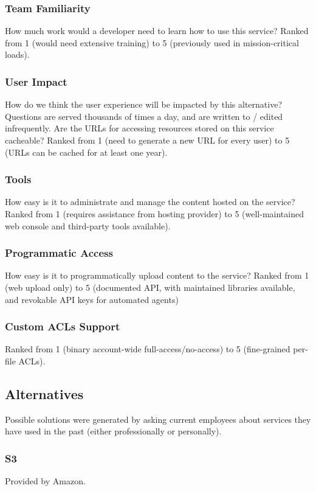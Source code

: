 \documentclass[se]{uw-wkrpt}
\begin{document}
\subsubsection{Team Familiarity}
How much work would a developer need to learn how to use this service? Ranked 
from 1 (would need extensive training) to 5 (previously used in 
mission-critical loads).

\subsubsection{User Impact}
How do we think the user experience will be impacted by this alternative?
Questions are served thousands of times a day, and are written to / edited 
infrequently. Are the URLs for accessing resources stored on this service 
cacheable? Ranked from 1 (need to generate a new URL for every user) to 5 (URLs 
can be cached for at least one year).

\subsubsection{Tools}
How easy is it to administrate and manage the content hosted on the service?  
Ranked from 1 (requires assistance from hosting provider) to 5 (well-maintained 
web console and third-party tools available).

\subsubsection{Programmatic Access}
How easy is it to programmatically upload content to the service?
Ranked from 1 (web upload only) to 5 (documented API, with maintained libraries 
available, and revokable API keys for automated agents)

\subsubsection{Custom ACLs Support}
Ranked from 1 (binary account-wide full-access/no-access) to 5 (fine-grained 
per-file ACLs).

\subsection{Alternatives}
Possible solutions were generated by asking current employees about services 
they have used in the past (either professionally or personally).

\subsubsection{S3}
Provided by Amazon.
\end{document}
